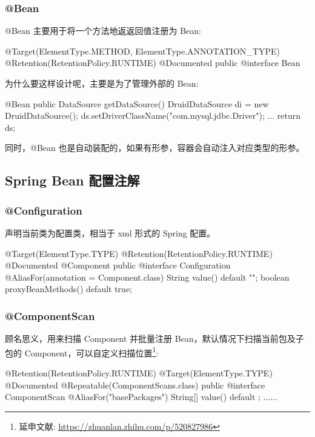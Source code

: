 \subsubsection{@Bean}

@Bean 主要用于将一个方法地返返回值注册为 Bean:

\begin{Java}
@Target({ElementType.METHOD, ElementType.ANNOTATION_TYPE})
@Retention(RetentionPolicy.RUNTIME)
@Documented
public @interface Bean
\end{Java}

为什么要这样设计呢，主要是为了管理外部的 Bean:

\begin{Java}
@Bean
public DataSource getDataSource() {
    DruidDataSource di = new DruidDataSource();
    ds.setDriverClassName("com.mysql.jdbc.Driver");
    ...
    return ds;
}
\end{Java}

同时，@Bean 也是自动装配的，如果有形参，容器会自动注入对应类型的形参。

\subsection{Spring Bean 配置注解}

\subsubsection{@Configuration}

声明当前类为配置类，相当于 xml 形式的 Spring 配置。

\begin{Java}
@Target(ElementType.TYPE)
@Retention(RetentionPolicy.RUNTIME)
@Documented
@Component
public @interface Configuration {
    @AliasFor(annotation = Component.class)
    String value() default "";
    boolean proxyBeanMethods() default true;
}
\end{Java}

\subsubsection{@ComponentScan}

顾名思义，用来扫描 Component 并批量注册 Bean，默认情况下扫描当前包及子包的 Component，可以自定义扫描位置\footnote{延申文献: \url{https://zhuanlan.zhihu.com/p/520827986}}:

\begin{Java}
@Retention(RetentionPolicy.RUNTIME)
@Target(ElementType.TYPE)
@Documented
@Repeatable(ComponentScans.class)
public @interface ComponentScan {
    @AliasFor("basePackages")
    String[] value() default {};
    ......
}
\end{Java}

